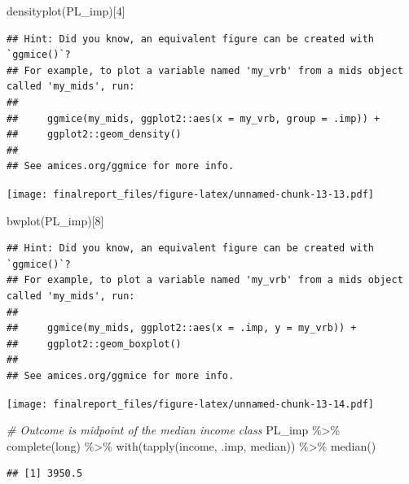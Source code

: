 \documentclass[
]{article}
\newenvironment{Shaded}{\begin{snugshade}}{\end{snugshade}}
\newcommand{\CommentTok}[1]{\textcolor[rgb]{0.56,0.35,0.01}{\textit{#1}}}
\newcommand{\DecValTok}[1]{\textcolor[rgb]{0.00,0.00,0.81}{#1}}
\newcommand{\FunctionTok}[1]{\textcolor[rgb]{0.00,0.00,0.00}{#1}}
\newcommand{\NormalTok}[1]{#1}
\newcommand{\SpecialCharTok}[1]{\textcolor[rgb]{0.00,0.00,0.00}{#1}}
\newcommand{\StringTok}[1]{\textcolor[rgb]{0.31,0.60,0.02}{#1}}
\begin{document}
\begin{Shaded}
\begin{Highlighting}[]
\FunctionTok{densityplot}\NormalTok{(PL\_imp)[}\DecValTok{4}\NormalTok{]}
\end{Highlighting}
\end{Shaded}

\begin{verbatim}
## Hint: Did you know, an equivalent figure can be created with `ggmice()`?
## For example, to plot a variable named 'my_vrb' from a mids object called 'my_mids', run: 
## 
##     ggmice(my_mids, ggplot2::aes(x = my_vrb, group = .imp)) +
##     ggplot2::geom_density() 
## 
## See amices.org/ggmice for more info.
\end{verbatim}

\texttt{[image: finalreport\_files/figure-latex/unnamed-chunk-13-13.pdf]}

\begin{Shaded}
\begin{Highlighting}[]
\FunctionTok{bwplot}\NormalTok{(PL\_imp)[}\DecValTok{8}\NormalTok{]}
\end{Highlighting}
\end{Shaded}

\begin{verbatim}
## Hint: Did you know, an equivalent figure can be created with `ggmice()`?
## For example, to plot a variable named 'my_vrb' from a mids object called 'my_mids', run: 
## 
##     ggmice(my_mids, ggplot2::aes(x = .imp, y = my_vrb)) +
##     ggplot2::geom_boxplot() 
## 
## See amices.org/ggmice for more info.
\end{verbatim}

\texttt{[image: finalreport\_files/figure-latex/unnamed-chunk-13-14.pdf]}

\begin{Shaded}
\begin{Highlighting}[]
\CommentTok{\# Outcome is midpoint of the median income class}
\NormalTok{PL\_imp }\SpecialCharTok{\%\textgreater{}\%} 
  \FunctionTok{complete}\NormalTok{(}\StringTok{\textquotesingle{}long\textquotesingle{}}\NormalTok{) }\SpecialCharTok{\%\textgreater{}\%} 
  \FunctionTok{with}\NormalTok{(}\FunctionTok{tapply}\NormalTok{(income, .imp, median)) }\SpecialCharTok{\%\textgreater{}\%} 
  \FunctionTok{median}\NormalTok{()}
\end{Highlighting}
\end{Shaded}

\begin{verbatim}
## [1] 3950.5
\end{verbatim}
\end{document}
